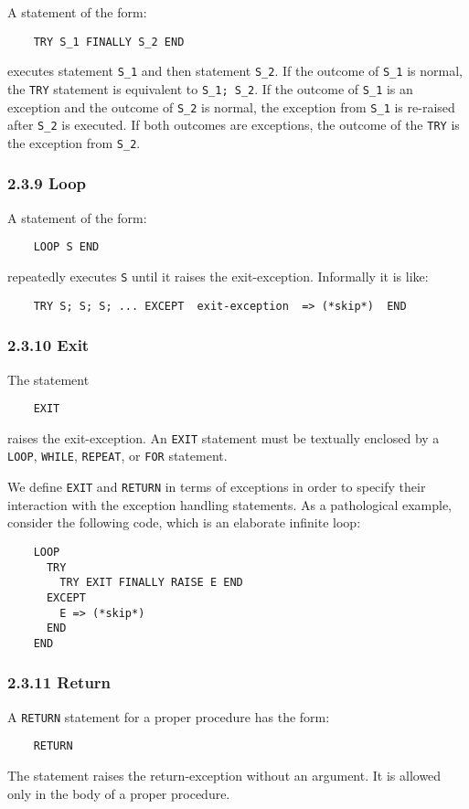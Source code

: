 \documentclass[10pt]{article}
\begin{document}
A statement of the form:
\begin{verbatim}
    TRY S_1 FINALLY S_2 END
\end{verbatim}
executes statement \verb|S_1| and then statement \verb|S_2|.  If the outcome
of \verb|S_1| is normal, the \verb|TRY| statement is equivalent to
\verb|S_1; S_2|.  If the outcome of \verb|S_1| is an exception and the outcome
of \verb|S_2| is normal, the exception from \verb|S_1| is re-raised after
\verb|S_2| is executed.  If both outcomes are exceptions, the outcome of the
\verb|TRY| is the exception from \verb|S_2|.

\subsubsection*{2.3.9 Loop}

A statement of the form:
\begin{verbatim}
    LOOP S END
\end{verbatim}
repeatedly executes \verb|S| until it raises the exit-exception.  Informally
it is like:
\begin{verbatim}
    TRY S; S; S; ... EXCEPT  exit-exception  => (*skip*)  END
\end{verbatim}

\subsubsection*{2.3.10 Exit}

The statement
\begin{verbatim}
    EXIT
\end{verbatim}
raises the exit-exception.  An \verb|EXIT| statement must be textually
enclosed by a \verb|LOOP|, \verb|WHILE|, \verb|REPEAT|, or \verb|FOR|
statement.

We define \verb|EXIT| and \verb|RETURN| in terms of exceptions in order to
specify their interaction with the exception handling statements.  As a
pathological example, consider the following code, which is an elaborate
infinite loop:
\begin{verbatim}
    LOOP
      TRY
        TRY EXIT FINALLY RAISE E END
      EXCEPT
        E => (*skip*)
      END
    END
\end{verbatim}

\subsubsection*{2.3.11 Return}

A \verb|RETURN| statement for a proper procedure has the form:
\begin{verbatim}
    RETURN
\end{verbatim}
The statement raises the return-exception without an argument.  It is allowed
only in the body of a proper procedure.
\end{document}
